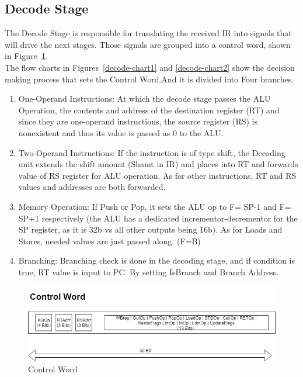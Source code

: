 \documentclass[12pt]{article}
\theoremstyle{plain}
\theoremstyle{definition}
\begin{document}
\subsection{Decode Stage}
The Decode Stage is responsible for translating the received IR into signals that will drive the next stages. Those signals are grouped into a control word, shown in Figure~\ref{control-word}. 
\\ The flow charts in Figures~\ref{decode-chart1} and \ref{decode-chart2} show the decision making process that sets the Control Word.And it is divided into Four branches. 
\begin{enumerate}
\item One-Operand Instructions: At which the decode stage passes the ALU Operation, the contents and address of the destination register (RT) and since they are one-operand instructions, the source register (RS) is nonexistent and thus its value is passed as 0 to the ALU.
\item Two-Operand Instructions: If the instruction is of type shift, the Decoding unit extends the shift amount (Shamt in IR) and places into RT and forwards value of RS register for ALU operation. As for other instructions, RT and RS values and addresses are both forwarded. 
\item Memory Operation: If Push or Pop, it sets the ALU op to F= SP-1 and F= SP+1 respectively (the ALU has a dedicated incrementor-decrementor for the SP register, as it is 32b vs all other outputs being 16b). As for Loads and Stores, needed values are just passed along. (F=B)
\item Branching: Branching check is done in the decoding stage, and if condition is true, RT value is input to PC. By setting IsBranch and Branch Address. 
\end{enumerate}
\begin{figure}
    \centering
    \includegraphics[width=\textwidth,height=\textheight,keepaspectratio]{Diagrams/ControlWord.png}
    \caption{Control Word}
    \label{control-word}
\end{figure}
\end{document}
